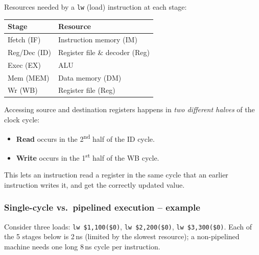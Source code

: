 \begin{center}
\end{center}

Resources needed by a \texttt{lw} (load) instruction at each stage:

\begin{center}
\begin{tabular}{@{}ll@{}}
\toprule
Stage & Resource \\
\midrule
Ifetch (IF)  & Instruction memory (IM) \\
Reg/Dec (ID) & Register file \& decoder (Reg) \\
Exec (EX)    & ALU \\
Mem (MEM)    & Data memory (DM) \\
Wr (WB)      & Register file (Reg) \\
\bottomrule
\end{tabular}
\end{center}

\begin{note}
Accessing source and destination registers happens in \emph{two different
halves} of the clock cycle:
\begin{itemize}
  \item \textbf{Read} occurs in the 2\textsuperscript{nd} half of the ID
  cycle.
  \item \textbf{Write} occurs in the 1\textsuperscript{st} half of the WB
  cycle.
\end{itemize}
This lets an instruction read a register in the same cycle that an earlier
instruction writes it, and get the correctly updated value.
\end{note}

\subsubsection{Single-cycle vs.\ pipelined execution -- example}

Consider three loads: \texttt{lw \$1,100(\$0)}, \texttt{lw \$2,200(\$0)},
\texttt{lw \$3,300(\$0)}. Each of the 5 stages below is 2\,ns (limited by the
slowest resource); a non-pipelined machine needs one long 8\,ns cycle per
instruction.

